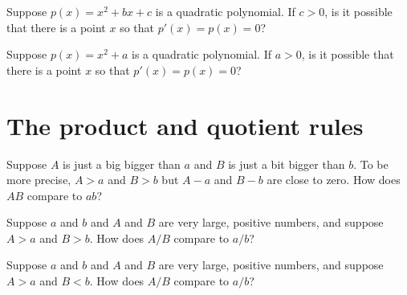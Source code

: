 \documentclass{ximera}
\begin{document}
\begin{problem}
  Suppose $p(x) = x^2 + bx + c$ is a quadratic polynomial.  If $c > 0$, is it possible that there is a point $x$ so that $p'(x) = p(x) = 0$?
  \begin{multipleChoice}
  \end{multipleChoice}
\end{problem}

\begin{problem}
  Suppose $p(x) = x^2 + a$ is a quadratic polynomial.  If $a > 0$, is it possible that there is a point $x$ so that $p'(x) = p(x) = 0$?
  \begin{multipleChoice}
  \end{multipleChoice}
\end{problem}

\clearpage

\section{The product and quotient rules}

\begin{problem}
  Suppose $A$ is just a big bigger than $a$ and $B$ is just a bit
  bigger than $b$.  To be more precise, $A > a$ and $B > b$ but
  $A - a$ and $B-b$ are close to zero.  How does $AB$ compare to $ab$?
  \begin{multipleChoice}
  \end{multipleChoice}
\end{problem}

\begin{problem}
  Suppose $a$ and $b$ and $A$ and $B$ are very large, positive numbers, and suppose $A > a$ and $B > b$.  How does $A/B$ compare to $a/b$?
  \begin{multipleChoice}
  \end{multipleChoice}
\end{problem}

\begin{problem}
  Suppose $a$ and $b$ and $A$ and $B$ are very large, positive numbers, and suppose $A > a$ and $B < b$.  How does $A/B$ compare to $a/b$?
  \begin{multipleChoice}
  \end{multipleChoice}
\end{problem}
\end{document}
